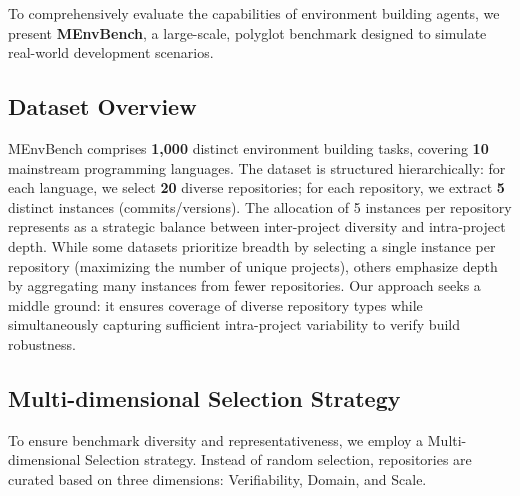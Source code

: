 \documentclass{article}
\theoremstyle{plain}
\theoremstyle{definition}
\theoremstyle{remark}
\begin{document}
To comprehensively evaluate the capabilities of environment building agents, we present \textbf{MEnvBench}, a large-scale, polyglot benchmark designed to simulate real-world development scenarios.

\subsection{Dataset Overview}
MEnvBench comprises \textbf{1,000} distinct environment building tasks, covering \textbf{10} mainstream programming languages. The dataset is structured hierarchically: for each language, we select \textbf{20} diverse repositories; for each repository, we extract \textbf{5} distinct instances (commits/versions). 
The allocation of 5 instances per repository represents as a strategic balance between inter-project diversity and intra-project depth. While some datasets prioritize breadth by selecting a single instance per repository (maximizing the number of unique projects), others emphasize depth by aggregating many instances from fewer repositories. Our approach seeks a middle ground: it ensures coverage of diverse repository types while simultaneously capturing sufficient intra-project variability to verify build robustness.



\subsection{Multi-dimensional Selection Strategy}

To ensure benchmark diversity and representativeness, we employ a Multi-dimensional Selection strategy. Instead of random selection, repositories are curated based on three dimensions: Verifiability, Domain, and Scale.
\end{document}
